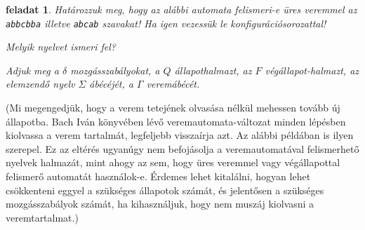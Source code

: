 \documentclass[a4paper]{article}
\newtheorem{feladat}{feladat}[section]
\begin{document}
\begin{feladat}{}
Határozzuk meg, hogy az alábbi automata felismeri-e üres veremmel az
\verb|abbcbba| illetve \verb+abcab+ szavakat!
Ha igen vezessük le konfigurációsorozattal!

Melyik nyelvet ismeri fel?

Adjuk meg a $\delta$  mozgásszabályokat, a $Q$ állapothalmazt, az $F$
végállapot-halmazt, az elemzendő nyelv $\Sigma$ ábécéjét, a $\Gamma$ veremábécét.

\end{feladat}

(Mi megengedjük, hogy a verem tetejének olvasása nélkül mehessen tovább
új állapotba. Bach Iván könyvében lévő veremautomata-változat minden
lépésben kiolvassa a verem tartalmát, legfeljebb visszaírja azt. Az
alábbi példában is ilyen szerepel. Ez az eltérés ugyanúgy nem
befojásolja a veremautomatával felismerhető nyelvek halmazát, mint ahogy
az sem, hogy üres veremmel vagy végállapottal felismerő automatát
használok-e. Érdemes lehet kitalálni, hogyan lehet csökkenteni eggyel a
szükséges állapotok számát, és jelentősen a szükséges mozgásszabályok
számát, ha kihasználjuk, hogy nem muszáj kiolvasni a veremtartalmat.)
\end{document}
